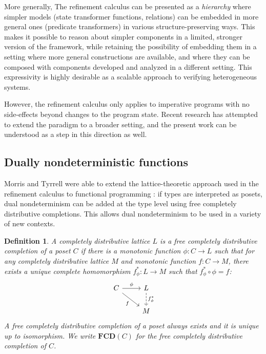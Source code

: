 \documentclass[draft,11pt]{report}
\newtheorem{definition}{Definition}
\begin{document}
More generally,
The refinement calculus can be presented as a \emph{hierarchy}
where simpler models (state transformer functions, relations)
can be embedded in more general ones (predicate transformers)
in various structure-preserving ways.
This makes it possible to reason about simpler components
in a limited, stronger version of the framework,
while retaining the possibility of embedding them
in a setting
where more general constructions are available,
and where they can be composed with components
developed and analyzed in a different setting.
This expressivity is highly desirable
as a scalable approach to
verifying heterogeneous systems.

However,
the refinement calculus only applies to imperative programs
with no side-effects beyond changes to the program state.
Recent research has attempted to extend the paradigm
to a broader setting,
and the present work can be understood
as a step in this direction as well.


\subsection{Dually nondeterministic functions} %

Morris and Tyrrell were able to extend
the lattice-theoretic approach used in the refinement calculus
to functional programming
\citep{augtyp,dndf,cspdnd}:
if types are interpreted as posets,
dual nondeterminism can be added at the type level
using free completely distributive completions.
This allows dual nondeterminism to be used
in a variety of new contexts.

\begin{definition}
A completely distributive lattice $L$ is a
\emph{free completely distributive completion} of
a poset $C$ if there is
a monotonic function $\phi : C \rightarrow L$
such that
for any completely distributive lattice $M$
and monotonic function $f : C \rightarrow M$,
there exists a unique complete homomorphism $f^*_\phi : L \rightarrow M$
such that $f^*_\phi \circ \phi = f$:
\[
  \begin{tikzcd}%
    C \arrow[r, "\phi"] \arrow[rd, "f"'] &
    L \arrow[d, "f^*_\phi", dashed] \\ & M
  \end{tikzcd}
\]
A free completely distributive completion of a poset
always exists and it is unique up to isomorphism.
We write $\mathbf{FCD}(C)$ for
the free completely distributive completion of $C$.
\end{definition}
\end{document}
